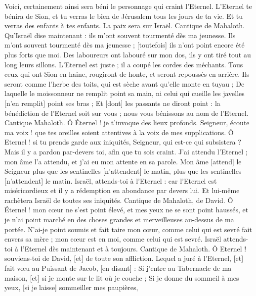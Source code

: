 \begin{multicols}{2}
Voici, certainement ainsi sera béni le personnage qui craint l'Eternel.
L'Eternel te bénira de Sion, et tu verras le bien de Jérusalem tous les jours de ta vie.
Et tu verras des enfants à tes enfants. La paix sera sur Israël.
\VerseOne{}Cantique de Mahaloth. Qu'Israël dise maintenant : ils m'ont souvent tourmenté dès ma jeunesse.
Ils m'ont souvent tourmenté dès ma jeunesse ; [toutefois] ils n'ont point encore été plus forts que moi.
Des laboureurs ont labouré sur mon dos, ils y ont tiré tout au long leurs sillons.
L'Eternel est juste ; il a coupé les cordes des méchants.
Tous ceux qui ont Sion en haine, rougiront de honte, et seront repoussés en arrière.
Ils seront comme l'herbe des toits, qui est sèche avant qu'elle monte en tuyau ;
De laquelle le moissonneur ne remplit point sa main, ni celui qui cueille les javelles [n'en remplit] point ses bras ;
Et [dont] les passants ne diront point : la bénédiction de l'Eternel soit sur vous ; nous vous bénissons au nom de l'Eternel.
\VerseOne{}Cantique Mahaloth. Ô Éternel ! je t'invoque des lieux profonds.
Seigneur, écoute ma voix ! que tes oreilles soient attentives à la voix de mes supplications.
Ô Eternel ! si tu prends garde aux iniquités, Seigneur, qui est-ce qui subsistera ?
Mais il y a pardon par-devers toi, afin que tu sois craint.
J'ai attendu l'Eternel ; mon âme l'a attendu, et j'ai eu mon attente en sa parole.
Mon âme [attend] le Seigneur plus que les sentinelles [n'attendent] le matin, plus que les sentinelles [n'attendent] le matin.
Israël, attends-toi à l'Eternel : car l'Eternel est miséricordieux et il y a rédemption en abondance par devers lui.
Et lui-même rachètera Israël de toutes ses iniquités.
\VerseOne{}Cantique de Mahaloth, de David. Ô Éternel ! mon cœur ne s'est point élevé, et mes yeux ne se sont point haussés, et je n'ai point marché en des choses grandes et merveilleuses au-dessus de ma portée.
N'ai-je point soumis et fait taire mon cœur, comme celui qui est sevré fait envers sa mère ; mon cœur est en moi, comme celui qui est sevré.
Israël attends-toi à l'Eternel dès maintenant et à toujours.
\VerseOne{}Cantique de Mahaloth. Ô Eternel ! souviens-toi de David, [et] de toute son affliction.
Lequel a juré à l'Eternel, [et] fait vœu au Puissant de Jacob, [en disant] :
Si j'entre au Tabernacle de ma maison, [et] si je monte sur le lit où je couche ;
Si je donne du sommeil à mes yeux, [si je laisse] sommeiller mes paupières,

\end{multicols}
